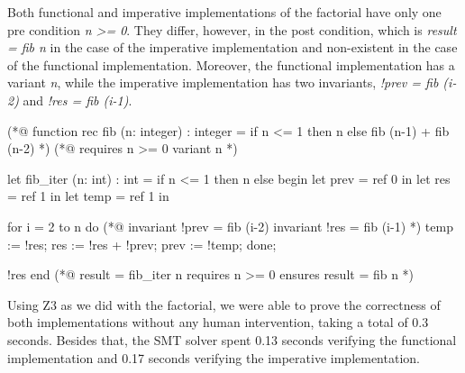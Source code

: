 Both functional and imperative implementations of the factorial have only one pre condition \emph{n >= 0}.
They differ, however, in the post condition, which is \emph{result = fib n} in the case of the imperative implementation and non-existent in the case of the functional implementation.
Moreover, the functional implementation has a variant \emph{n}, while the imperative implementation has two invariants, \emph{!prev = fib (i-2)} and \emph{!res = fib (i-1)}. 

\begin{minipage}{\linewidth}
\begin{gospel}
  (*@ function rec fib (n: integer) : integer =
  if n <= 1 then n else fib (n-1) + fib (n-2) *)
  (*@ requires n >= 0 
    variant n *)
\end{gospel}
\end{minipage}

\bigskip

\begin{minipage}{\linewidth}
\begin{ocamlenv}
  let fib_iter (n: int) : int =
    if n <= 1 then n
    else
      begin
        let prev = ref 0 in 
        let res = ref 1 in
        let temp = ref 1 in

        for i = 2 to n do
          (*@ invariant !prev = fib (i-2)
            invariant !res = fib (i-1) *)
          temp := !res;
          res := !res + !prev;
          prev := !temp;
        done;

        !res
      end
  (*@ result = fib_iter n
    requires n >= 0 
    ensures result = fib n *)
\end{ocamlenv}
\end{minipage}

\bigskip

Using Z3 as we did with the factorial, we were able to prove the correctness of both implementations without any human intervention, taking a total of 0.3 seconds.
Besides that, the SMT solver spent 0.13 seconds verifying the functional implementation and 0.17 seconds verifying the imperative implementation.

